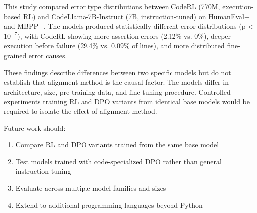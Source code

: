 
This study compared error type distributions between CodeRL (770M, execution-based RL) and CodeLlama-7B-Instruct (7B, instruction-tuned) on HumanEval+ and MBPP+. The models produced statistically different error distributions (p < $10^{-7})$, with CodeRL showing more assertion errors (2.12\% vs. 0\%), deeper execution before failure (29.4\% vs. 0.09\% of lines), and more distributed fine-grained error causes.

These findings describe differences between two specific models but do not establish that alignment method is the causal factor. The models differ in architecture, size, pre-training data, and fine-tuning procedure. Controlled experiments training RL and DPO variants from identical base models would be required to isolate the effect of alignment method.

Future work should:
\begin{enumerate}
\item Compare RL and DPO variants trained from the same base model
\item Test models trained with code-specialized DPO rather than general instruction tuning
\item Evaluate across multiple model families and sizes
\item Extend to additional programming languages beyond Python
\end{enumerate}

